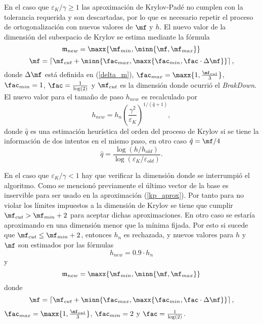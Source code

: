  En el caso que $\varepsilon_{K}/\gamma\geq 1$ las aproximación de Krylov-Padé no cumplen con la tolerancia 
 requerida y son descartadas, por lo que es necesario repetir el proceso de ortogonalización con nuevos valores de $\mf$ y $h$. El nuevo valor de la dimensión del subespacio de Krylov se estima mediante la fórmula 
 \begin{equation}\label{kry-reject-m1}
 \mathfrak{m}_{new}= \maxx{\mf_{min}, \minn{\mf , \mf_{max} }}
 \end{equation}
 \begin{equation*}
 \mf = \left\lceil \mf_{cut} + \minn{\fac_{max} , \maxx{\fac_{min}, 
 		\fac\cdot\Delta\mf} } \right\rceil,
 \end{equation*}
donde $\Delta\mf$ está definida en (\ref{delta_m}), $\fac_{max}= \maxx{ 1,\frac{\mf_{cut}}{3} }$, $\fac_{min}= 1 $, $\fac=\frac{1}{\log(2)}$ 
y $\mf_{cut}$ es la dimensión donde ocurrió el \emph{BrakDown}. El nuevo valor para el tamaño de paso $h_{new}$ es recalculado por \cite{phi}
\begin{equation}
h_{new} = h_n\left(\frac{\gamma^{2}}{\varepsilon_{K}}\right)^{1/(\hat{q}+1)}\label{kry-reject-h1},
\end{equation}
donde $\hat{q}$ es una estimación heurística del orden del proceso de Krylov
si se tiene la información de dos intentos en el mismo paso, en otro caso $\hat{q}=\mf/4$
\begin{equation*}%
\hat{q} = \frac{\log\left( h/h_{old} \right)}{\log\left(\varepsilon_{K}/\varepsilon_{old}  \right)}.
\end{equation*}

En el caso que $\varepsilon_{K}/\gamma< 1$ hay que verificar la dimensión donde se interrumpió
el algoritmo. Como se mencionó previamente el último vector de la base es inservible para ser usado en la aproximación (\ref{kp_aprox}). Por tanto para no violar los límites impuestos a la dimensión de Krylov se tiene que cumplir 
$\mf_{cut}> \mf_{min}+2$ para aceptar dichas aproximaciones. En otro caso se estaría aproximando
en una dimensión menor que la mínima fijada. Por esto si sucede que $\mf_{cut}\leq \mf_{min}+2$, 
entonces $h_n$ es rechazada, y nuevos valores para $h$ y $\mf$ son estimados  por las fórmulas
\begin{equation}
h_{new}=0\mathord{.}9\cdot h_n\label{kry-reject-h2}
\end{equation}
y
 \begin{equation}\label{kry-reject-m2}
\mathfrak{m}_{new}= \maxx{\mf_{min}, \minn{\mf , \mf_{max} }}
\end{equation}
donde 
\begin{equation*}
\mf = \left\lceil \mf_{cut} + \minn{\fac_{max} , \maxx{\fac_{min}, 
		\fac\cdot\Delta\mf} } \right\rceil,
\end{equation*}
$\fac_{max}= \maxx{ 1,\frac{\mf_{cut}}{3} }$, $\fac_{min}= 2 $ y $\fac=\frac{1}{\log(2)}$.


